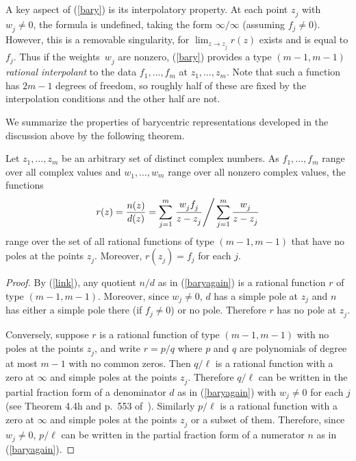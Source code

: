 \documentclass[final]{siamltex}
\begin{document}
A key aspect of (\ref{bary}) is its interpolatory property.  At
each point $z_j^{}$ with $w_j^{}\ne 0$, the formula is undefined,
taking the form $\infty / \infty$ (assuming $f_j \ne 0$).  However,
this is a removable singularity, for $\lim_{z\to z_j^{}} r(z)$
exists and is equal to $f_j^{}$.  Thus if the weights~$w_j^{}$
are nonzero, (\ref{bary}) provides a type $(m-1,m-1)$ {\em
rational interpolant} to the data $f_1^{},\dots,f_m^{}$ at
$z_1^{},\dots,z_m^{}$.  Note that such a function has $2m-1$
degrees of freedom, so roughly half of these are fixed by the
interpolation conditions and the other half are not.

We summarize the properties of barycentric representations
developed in the discussion above by the following theorem.

\medskip

\begin{theorem}
Let $z_1^{},\dots, z_m^{}$ be an arbitrary set of distinct complex
numbers.  As $f_1^{},\dots ,f_m^{}$ range over all complex values
and $w_1^{},\dots ,w_m^{}$ range over all nonzero
complex values, the functions
\begin{equation}
r(z) = {n(z)\over d(z)} =
{\sum_{j=1}^m \left. {w_j^{} f_j^{}\over z- z_j^{}} \right/
\sum_{j=1}^m  {w_j^{} \over z- z_j^{}}}
\label{baryagain}
\end{equation}
range over the set of all
rational functions of type $(m-1,m-1)$ that have
no poles at the points $z_j^{}$.
Moreover, $r(z_j^{}) = f_j^{}$ for each $j$.
\end{theorem}

\begin{proof}
By (\ref{link}), any quotient $n/d$ as in (\ref{baryagain}) is a rational
function $r$ of type $(m-1,m-1)$.  
Moreover, since $w_j\ne 0$, $d$ has a simple pole at $z_j$ and
$n$ has either a simple pole there (if $f_j^{}\ne 0$) or no pole.  Therefore
$r$ has no pole at $z_j^{}$.

Conversely, suppose $r$ is a rational
function of type $(m-1,m-1)$ with no poles at
the points $z_j^{}$, and write $r = p/q$ where $p$ and $q$ are
polynomials of degree at most $m-1$ with no common zeros. 
Then $q/\ell$ is a rational function with a zero at $\infty$
and simple poles at the points $z_j^{}$.  Therefore $q/\ell$
can be written in the partial fraction form of a denominator
$d$ as in (\ref{baryagain}) with $w_j \ne 0 $ for each $j$ (see
Theorem 4.4h and p.~553 of~\cite{henrici}).
Similarly $p/\ell$ is a rational function with a zero at $\infty$
and simple poles at the points $z_j^{}$ or a subset of them.
Therefore, since $w_j\ne 0$, $p/\ell$
can be written in the partial fraction form of a numerator
$n$ as in (\ref{baryagain}).
\end{proof}
\end{document}
